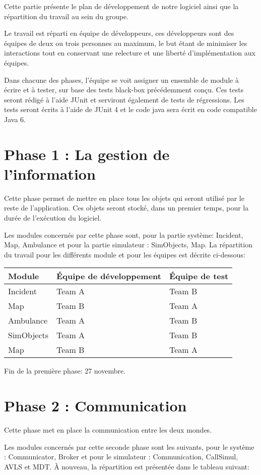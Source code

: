 Cette partie présente le plan de développement de notre logiciel ainsi que
la répartition du travail au sein du groupe.

Le travail est réparti en équipe de développeurs, ces développeurs sont des
équipes de deux ou trois personnes au maximum, le but étant de minimiser les 
interactions tout en conservant une relecture et une liberté d'implémentation
aux équipes.

Dans chacune des phases, l'équipe se voit assigner un ensemble de module à 
écrire et à tester, sur base des tests black-box précédemment conçu. Ces tests
seront rédigé à l'aide JUnit et serviront également de tests de régressions.
Les tests seront écrits à l'aide de JUnit 4 et le code java sera écrit
en code compatible Java 6.

\section{Phase 1 : La gestion de l'information}
Cette phase permet de mettre en place tous les objets qui seront utilisé
par le reste de l'application. Ces objets seront stocké, dans un premier
temps, pour la durée de l'exécution du logiciel.

Les modules concernés par cette phase sont, pour la
partie système: Incident, Map, Ambulance et pour la partie simulateur : SimObjects, Map.
La répartition du travail pour 
les différents module et pour les équipes est décrite ci-dessous:

\noindent\begin{tabularx}{\textwidth}{|l|l|X|}
\hline
Module			& 	Équipe de développement & Équipe de test\\
\hline
Incident	&	Team A 	&	Team B	\\
Map 		&	Team B	&	Team A	\\
Ambulance	&	Team A  &	Team B	\\
SimObjects	&	Team A  &	Team B	\\
Map			&	Team B  &	Team A	\\
\hline
\end{tabularx}

Fin de la première phase: 27 novembre.

\section{Phase 2 : Communication}
Cette phase met en place la communication entre les deux mondes.

Les modules concernés par cette seconde phase sont les suivants, pour
le système : Communicator, Broker et pour le simulateur : Communication, CallSimul, AVLS et MDT.
À nouveau, la répartition est présentée dans le tableau suivant:

